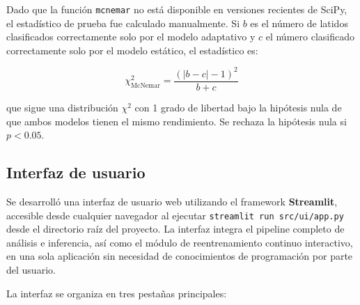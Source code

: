 Dado que la función \texttt{mcnemar} no está disponible en versiones recientes de SciPy, el estadístico de prueba fue calculado manualmente. Si $b$ es el número de latidos clasificados correctamente solo por el modelo adaptativo y $c$ el número clasificado correctamente solo por el modelo estático, el estadístico es:

\begin{equation}
\chi^2_\text{McNemar} = \frac{(|b - c| - 1)^2}{b + c}
\label{eq:mcnemar}
\end{equation}

que sigue una distribución $\chi^2$ con 1 grado de libertad bajo la hipótesis nula de que ambos modelos tienen el mismo rendimiento. Se rechaza la hipótesis nula si $p < 0.05$.

\subsection{Interfaz de usuario}

Se desarrolló una interfaz de usuario web utilizando el framework \textbf{Streamlit}, accesible desde cualquier navegador al ejecutar \texttt{streamlit run src/ui/app.py} desde el directorio raíz del proyecto. La interfaz integra el pipeline completo de análisis e inferencia, así como el módulo de reentrenamiento continuo interactivo, en una sola aplicación sin necesidad de conocimientos de programación por parte del usuario.

La interfaz se organiza en tres pestañas principales:

